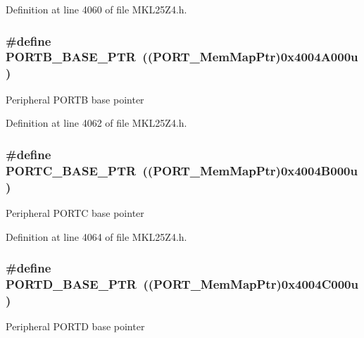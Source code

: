 Definition at line 4060 of file M\+K\+L25\+Z4.\+h.

\subsubsection[{\texorpdfstring{P\+O\+R\+T\+B\+\_\+\+B\+A\+S\+E\+\_\+\+P\+TR}{PORTB_BASE_PTR}}]{\setlength{\rightskip}{0pt plus 5cm}\#define P\+O\+R\+T\+B\+\_\+\+B\+A\+S\+E\+\_\+\+P\+TR~(({\bf P\+O\+R\+T\+\_\+\+Mem\+Map\+Ptr})0x4004\+A000u)}\hypertarget{group___p_o_r_t___peripheral_ga585b4782d1ceb44492289af0019480f9}{}\label{group___p_o_r_t___peripheral_ga585b4782d1ceb44492289af0019480f9}
Peripheral P\+O\+R\+TB base pointer 

Definition at line 4062 of file M\+K\+L25\+Z4.\+h.

\subsubsection[{\texorpdfstring{P\+O\+R\+T\+C\+\_\+\+B\+A\+S\+E\+\_\+\+P\+TR}{PORTC_BASE_PTR}}]{\setlength{\rightskip}{0pt plus 5cm}\#define P\+O\+R\+T\+C\+\_\+\+B\+A\+S\+E\+\_\+\+P\+TR~(({\bf P\+O\+R\+T\+\_\+\+Mem\+Map\+Ptr})0x4004\+B000u)}\hypertarget{group___p_o_r_t___peripheral_ga03c740cdda17711afafc932723871474}{}\label{group___p_o_r_t___peripheral_ga03c740cdda17711afafc932723871474}
Peripheral P\+O\+R\+TC base pointer 

Definition at line 4064 of file M\+K\+L25\+Z4.\+h.

\subsubsection[{\texorpdfstring{P\+O\+R\+T\+D\+\_\+\+B\+A\+S\+E\+\_\+\+P\+TR}{PORTD_BASE_PTR}}]{\setlength{\rightskip}{0pt plus 5cm}\#define P\+O\+R\+T\+D\+\_\+\+B\+A\+S\+E\+\_\+\+P\+TR~(({\bf P\+O\+R\+T\+\_\+\+Mem\+Map\+Ptr})0x4004\+C000u)}\hypertarget{group___p_o_r_t___peripheral_ga7f5a263751543810ebfdbde278383276}{}\label{group___p_o_r_t___peripheral_ga7f5a263751543810ebfdbde278383276}
Peripheral P\+O\+R\+TD base pointer 

